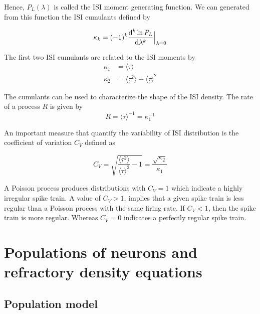 \documentclass[12pt,twoside]{report}
\def \dd  {{\rm d}}
\begin{document}
Hence, $P_L(\lambda)$ is called the ISI moment generating function. We can generated from this function the ISI cumulants defined by

\begin{equation}
\label{eq:Pcumulant}
\kappa_k=(-1)^k\frac{\dd^k \ln P_L}{\dd \lambda^k}\Bigr|_{\lambda=0}
\end{equation}

The first two ISI cumulants are related to the ISI moments by
\begin{align}
\label{eq:kappa1234}
\kappa_1&=\langle\tau\rangle\\
\kappa_2&=\langle\tau^2\rangle-\langle\tau\rangle^2
\end{align}


The cumulants can be used to characterize the shape of the ISI density. The rate of a process $R$ is given by
\begin{equation}
\label{eq:R}
R=\langle\tau\rangle^{-1}=\kappa_1^{-1}
\end{equation}

An important measure that quantify the variability of ISI distribution is the coefficient of variation $C_V$ defined as


\begin{equation}
\label{eq:CV}
C_V=\sqrt{\frac{\langle\tau^2\rangle}{\langle\tau\rangle^2}-1}=\frac{\sqrt{\kappa_2}}{\kappa_1}
\end{equation}

A Poisson process produces distributions with $C_V=1$ which indicate a highly irregular spike train. A value of $C_V>1$, implies that a given spike train is less regular than a Poisson process with the same firing rate. If $C_V<1$, then the spike train is more regular. Whereas $C_V=0$ indicates a perfectly regular spike train.


\section{Populations of neurons and refractory density equations}
\label{sec:refractory}
\subsection{Population model}
\end{document}
